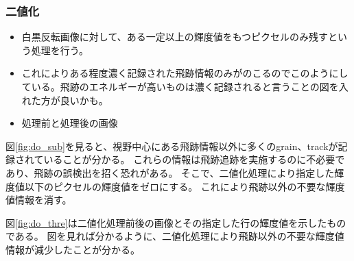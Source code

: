 \documentclass[12pt,a4paper]{jarticle}
\begin{document}
\subsubsection{二値化}
\begin{itemize}
    \item 白黒反転画像に対して、ある一定以上の輝度値をもつピクセルのみ残すという処理を行う。
    \item これによりある程度濃く記録された飛跡情報のみがのこるのでこのようにしている。飛跡のエネルギーが高いものは濃く記録されると言うことの図を入れた方が良いかも。
    \item 処理前と処理後の画像
\end{itemize}
図\ref{fig:do_sub}を見ると、視野中心にある飛跡情報以外に多くのgrain、trackが記録されていることが分かる。
これらの情報は飛跡追跡を実施するのに不必要であり、飛跡の誤検出を招く恐れがある。
そこで、二値化処理により指定した輝度値以下のピクセルの輝度値をゼロにする。
これにより飛跡以外の不要な輝度値情報を消す。
\par
図\ref{fig:do_thre}は二値化処理前後の画像とその指定した行の輝度値を示したものである。
図を見れば分かるように、二値化処理により飛跡以外の不要な輝度値情報が減少したことが分かる。
\end{document}
